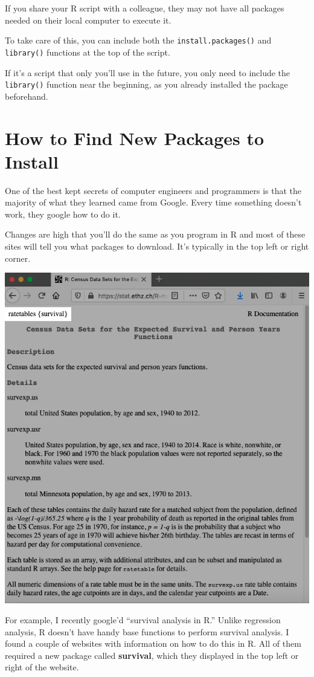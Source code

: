 \documentclass[
]{book}
\begin{document}
\begin{center}
If you share your R script with a colleague, they may not have all packages needed on their local computer to execute it.

To take care of this, you can include both the \texttt{install.packages()} and \texttt{library()} functions at the top of the script.

If it's a script that only you'll use in the future, you only need to include the \texttt{library()} function near the beginning, as you already installed the package beforehand.

\hypertarget{how-to-find-new-packages-to-install}{%
\section{How to Find New Packages to Install}\label{how-to-find-new-packages-to-install}}

One of the best kept secrets of computer engineers and programmers is that the majority of what they learned came from Google. Every time something doesn't work, they google how to do it.

Changes are high that you'll do the same as you program in R and most of these sites will tell you what packages to download. It's typically in the top left or right corner.

\begin{center}\includegraphics[width=0.6\linewidth]{1.42_Package_Info} \end{center}

For example, I recently google'd ``survival analysis in R.'' Unlike regression analysis, R doesn't have handy base functions to perform survival analysis. I found a couple of websites with information on how to do this in R. All of them required a new package called \textbf{survival}, which they displayed in the top left or right of the website.


\end{center}
\end{document}
